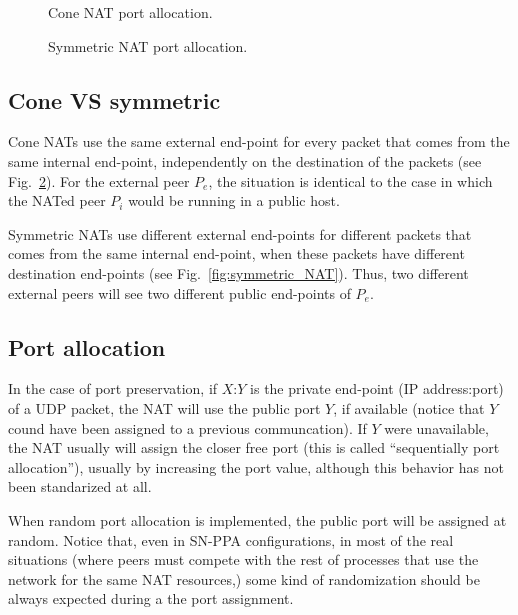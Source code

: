 \begin{figure}
  \caption{Cone NAT port allocation.\label{fig:cone_NAT}}
\end{figure}

\begin{figure}
  \caption{Symmetric NAT port allocation.\label{fig:cone_NAT}}
\end{figure}

\subsection{Cone VS symmetric}
Cone NATs use the same external end-point for every packet that comes
from the same internal end-point, independently on the destination of
the packets (see Fig.~\ref{fig:cone_NAT}). For the external peer
$P_e$, the situation is identical to the case in which the NATed peer
$P_i$ would be running in a public host.

Symmetric NATs use different external end-points for different packets
that comes from the same internal end-point, when these packets have
different destination end-points (see
Fig.~\ref{fig:symmetric_NAT}). Thus, two different external peers will
see two different public end-points of $P_e$.

\subsection{Port allocation}
In the case of port preservation, if $X$:$Y$ is the private end-point
(IP address:port) of a UDP packet, the NAT will use the public port
$Y$, if available (notice that $Y$ cound have been assigned to a
previous communcation). If $Y$ were unavailable, the NAT usually will
assign the closer free port (this is called ``sequentially port
allocation''), usually by increasing the port value, although this
behavior has not been standarized at all.

When random port allocation is implemented, the public port will be
assigned at random. Notice that, even in SN-PPA configurations, in
most of the real situations (where peers must compete with the rest of
processes that use the network for the same NAT resources,) some kind
of randomization should be always expected during a the port
assignment.

